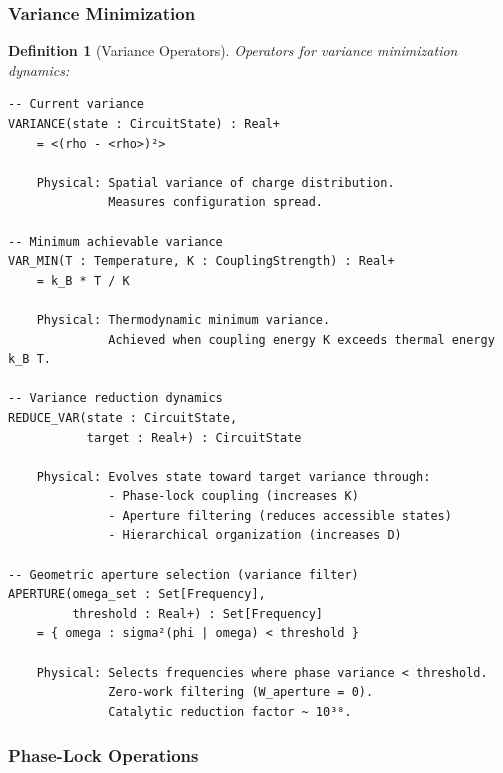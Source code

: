 \documentclass[aps,prd,twocolumn,superscriptaddress,floatfix,nofootinbib]{revtex4-2}
\newtheorem{definition}[theorem]{Definition}
\theoremstyle{remark}
\begin{document}
\subsubsection{Variance Minimization}

\begin{definition}[Variance Operators]
\label{def:variance_ops}
Operators for variance minimization dynamics:
\begin{verbatim}
-- Current variance
VARIANCE(state : CircuitState) : Real+
    = <(rho - <rho>)²>
    
    Physical: Spatial variance of charge distribution.
              Measures configuration spread.

-- Minimum achievable variance
VAR_MIN(T : Temperature, K : CouplingStrength) : Real+
    = k_B * T / K
    
    Physical: Thermodynamic minimum variance.
              Achieved when coupling energy K exceeds thermal energy k_B T.

-- Variance reduction dynamics
REDUCE_VAR(state : CircuitState,
           target : Real+) : CircuitState
    
    Physical: Evolves state toward target variance through:
              - Phase-lock coupling (increases K)
              - Aperture filtering (reduces accessible states)
              - Hierarchical organization (increases D)

-- Geometric aperture selection (variance filter)
APERTURE(omega_set : Set[Frequency],
         threshold : Real+) : Set[Frequency]
    = { omega : sigma²(phi | omega) < threshold }
    
    Physical: Selects frequencies where phase variance < threshold.
              Zero-work filtering (W_aperture = 0).
              Catalytic reduction factor ~ 10³⁸.
\end{verbatim}
\end{definition}

\subsubsection{Phase-Lock Operations}
\end{document}
